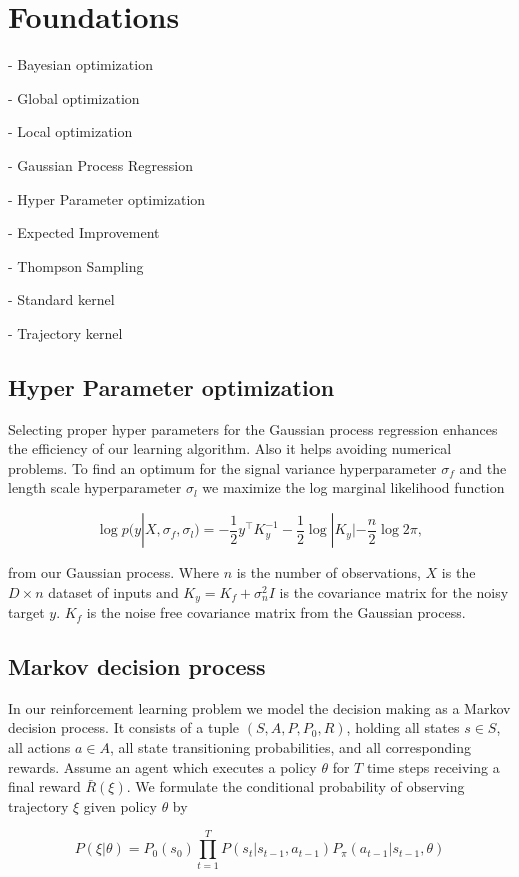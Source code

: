 \chapter{Foundations}
\label{chap:2}
%

- Bayesian optimization

- Global optimization

- Local optimization

- Gaussian Process Regression

- Hyper Parameter optimization

- Expected Improvement

- Thompson Sampling

- Standard kernel

- Trajectory kernel


\section{Hyper Parameter optimization}
Selecting proper hyper parameters for the Gaussian process regression enhances the efficiency of our learning algorithm. Also it helps avoiding numerical problems. To find an optimum for the signal variance hyperparameter $\sigma_f$ and the length scale hyperparameter $\sigma_l$ we maximize the log marginal likelihood function

$$\log p(y|X,\sigma_f,\sigma_l) = -\frac{1}{2} y^\top K_y^{-1} -\frac{1}{2} \log |K_y| -\frac{n}{2}\log 2\pi ,$$

from our Gaussian process. Where $n$ is the number of observations, $X$ is the $D \times n$ dataset of inputs and $K_y = K_f + \sigma_n^2 I$ is the covariance matrix for the noisy target $y$. $K_f$ is the noise free covariance matrix from the Gaussian process.


\section{Markov decision process}
In our reinforcement learning problem we model the decision making as a Markov decision process. It consists of a tuple $(S,A,P,P_{0},R)$, holding all states $s \in S$, all actions $a \in A$, all state transitioning probabilities, and all corresponding rewards. Assume an agent which executes a policy $\theta$ for $T$ time steps receiving a final reward $\bar{R}(\xi)$. We formulate the conditional probability of observing trajectory $\xi$ given policy $\theta$ by

$$P(\xi|\theta) = P_{0}(s_{0}) \prod_{t=1}^{T} P(s_{t}|s_{t-1}, a_{t-1}) P_{\pi}(a_{t-1}|s_{t-1}, \theta)$$

